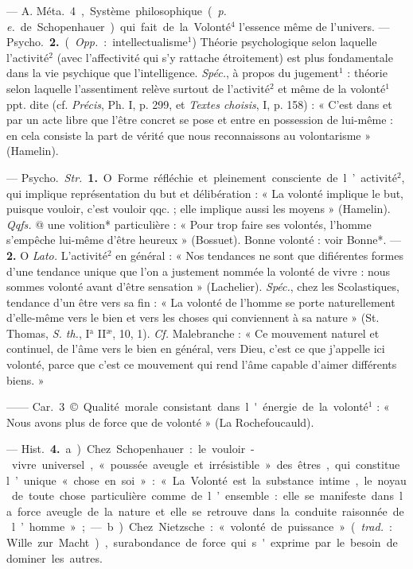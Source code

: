 \begin{itemize}[leftmargin=1cm, label=, itemsep=1pt]
 — A. \si{Méta.} 4, Système
philosophique ({\it p. e.} de Schopenhauer)
qui fait de la Volonté$^4$ l'essence
même de l'univers. — \si{Psycho.}
 {\bf 2.} ({\it Opp.} : intellectualisme$^1$) Théorie
psychologique selon laquelle l’activité$^2$ (avec l’affectivité qui s'y rattache étroitement) est plus fondamentale dans la vie psychique que
l'intelligence. {\it Spéc.}, à propos du
jugement$^1$ : théorie selon laquelle
l'assentiment relève surtout de l’activité$^2$ et même de la volonté$^1$ ppt.
dite (cf. {\it Précis}, Ph. I, p. 299, et
{\it Textes choisis}, I, p. 158) : « C’est
dans et par un acte libre que l'être
concret se pose et entre en possession de lui-même : en cela consiste
la part de vérité que nous reconnaissons au volontarisme » (Hamelin).

 — \si{Psycho.} {\it Str.} {\bf 1.} O. Forme
réfléchie et pleinement consciente de
l’activité$^2$, qui implique représentation du but et délibération : « La
volonté implique le but, puisque
vouloir, c’est vouloir qqc. ; elle implique aussi les moyens » (Hamelin).
{\it Qqfs.} @ une volition* particulière :
« Pour trop faire ses volontés,
l’homme s’empêche lui-même d’être
heureux » (Bossuet). Bonne volonté :
voir Bonne*. —  {\bf 2.} O {\it Lato.} L'activité$^2$
en général : « Nos tendances ne sont
que difiérentes formes d’une tendance unique que l’on a justement
nommée la volonté de vivre : nous
sommes volonté avant d'être sensation » (Lachelier). {\it Spéc.}, chez les
Scolastiques, tendance d’un être vers
sa fin : « La volonté de l’homme se
porte naturellement d'elle-même
vers le bien et vers les choses qui
conviennent à sa nature » (St. Thomas, {\it S. th.}, I$^\text{a}$ II$^\text{æ}$, 10, 1). {\it Cf.} Malebranche : « Ce mouvement naturel
et continuel, de l'âme vers le bien
en général, vers Dieu, c’est ce que
j'appelle ici volonté, parce que c’est
ce mouvement qui rend l'âme capable d'aimer différents biens. »

—— \si{Car.} 3 © Qualité morale
consistant dans l'énergie de la volonté$^1$ : « Nous avons plus de force
que de volonté » (La Rochefoucauld).

— \si{Hist.}  {\bf 4.} a) Chez Schopenhauer :
le vouloir-vivre universel, « poussée
aveugle et irrésistible » des êtres, qui
constitue l’unique « chose en soi » :
« La Volonté est la substance intime,
le noyau de toute chose particulière
comme de l’ensemble : elle se manifeste dans la force aveugle de la
nature et elle se retrouve dans la
conduite raisonnée de l’homme » ; —
b) Chez Nietzsche : « volonté de puissance » ({\it trad.} : Wille zur Macht),
surabondance de force qui s'exprime
par le besoin de dominer les autres.


\end{itemize}
